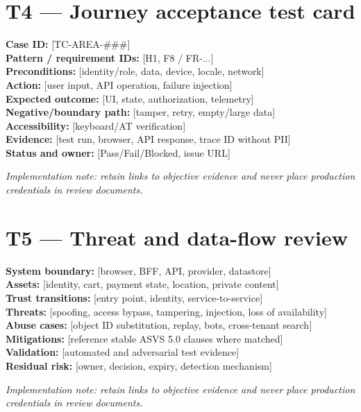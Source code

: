 \documentclass[11pt]{article}
\begin{document}
\section{T4 — Journey acceptance test card}
\begin{notebox}
\textbf{Case ID:} [TC-AREA-\#\#\#]\\
\textbf{Pattern / requirement IDs:} [H1, F8 / FR-...]\\
\textbf{Preconditions:} [identity/role, data, device, locale, network]\\
\textbf{Action:} [user input, API operation, failure injection]\\
\textbf{Expected outcome:} [UI, state, authorization, telemetry]\\
\textbf{Negative/boundary path:} [tamper, retry, empty/large data]\\
\textbf{Accessibility:} [keyboard/AT verification]\\
\textbf{Evidence:} [test run, browser, API response, trace ID without PII]\\
\textbf{Status and owner:} [Pass/Fail/Blocked, issue URL]\par\end{notebox}
\textit{Implementation note: retain links to objective evidence and never place production credentials in review documents.}
\section{T5 — Threat and data-flow review}
\begin{notebox}
\textbf{System boundary:} [browser, BFF, API, provider, datastore]\\
\textbf{Assets:} [identity, cart, payment state, location, private content]\\
\textbf{Trust transitions:} [entry point, identity, service-to-service]\\
\textbf{Threats:} [spoofing, access bypass, tampering, injection, loss of availability]\\
\textbf{Abuse cases:} [object ID substitution, replay, bots, cross-tenant search]\\
\textbf{Mitigations:} [reference stable ASVS 5.0 clauses where matched]\\
\textbf{Validation:} [automated and adversarial test evidence]\\
\textbf{Residual risk:} [owner, decision, expiry, detection mechanism]\par\end{notebox}
\textit{Implementation note: retain links to objective evidence and never place production credentials in review documents.}
\end{document}
